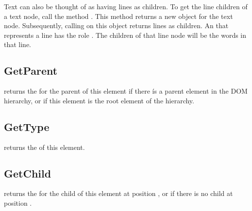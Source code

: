 \documentclass[letterpaper,12pt,english,openany,oneside]{sphinxmanual}
\begin{document}
Text can also be thought of as having lines as children. To get the line children of a text node, call the  method  . This method returns a new object for the text node. Subsequently, calling  on this object returns lines as children. An  that represents a line has the role  . The children of that line node will be the words in that line.


\subsection{GetParent}
\label{\detokenize{Access_DOM:getparent}}
 returns the  for the parent of this element if there ís a parent element in the DOM hierarchy, or  if this element is the root element of the hierarchy.

\begin{sphinxVerbatim}[commandchars=\\\{\}]
   
\end{sphinxVerbatim}


\subsection{GetType}
\label{\detokenize{Access_DOM:gettype}}
 returns the  of this element.

\begin{sphinxVerbatim}[commandchars=\\\{\}]
   
\end{sphinxVerbatim}




\subsection{GetChild}
\label{\detokenize{Access_DOM:getchild}}
 returns the  for the child of this element at position  , or  if there is no child at position  .
\end{document}
